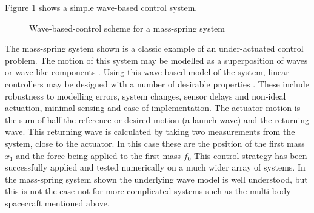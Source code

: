 \documentclass{mbd_fullpaper}
\begin{document}
Figure \ref{fig:wave-based-control} shows a simple wave-based control system.
\begin{figure}[h]
  \begin{center}
    \caption{Wave-based-control scheme for a mass-spring system \label{fig:wave-based-control}}
  \end{center}
\end{figure}
The mass-spring system shown is a classic example of an under-actuated control problem.
The motion of this system may be modelled as a superposition of waves or wave-like components \cite{OConnor2011}.
Using this wave-based model of the system, linear controllers may be designed with a number of desirable properties \cite{Connor2005}. 
These include robustness to modelling errors, system changes, sensor delays and non-ideal actuation, minimal sensing and ease of implementation.
The actuator motion is the sum of half the reference or desired motion (a launch wave) and the returning wave.
This returning wave is calculated by taking two measurements from the system, close to the actuator.
In this case these are the position of the first mass $x_1$ and the force being applied to the first mass $f_0$ 
This control strategy has been successfully applied and tested numerically on a much wider array of systems.
In the mass-spring system shown the underlying wave model is well understood, but this is not the case not for more complicated systems such as the multi-body spacecraft mentioned above.
\end{document}
